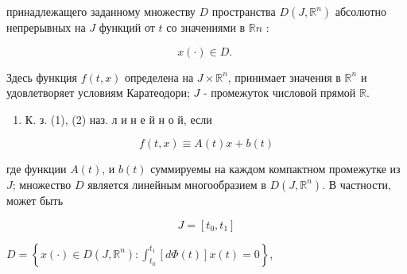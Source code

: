 \documentclass[10pt]{article}
\begin{document}
принадлежащего заданному множеству $D$ пространства $D\left(J, \mathbb{R}^{n}\right)$ абсолютно непрерывных на $J$ функций от $t$ со значениями в $\mathbb{R} n$ :



\[

x(\cdot) \in D \text {. }

\]



Здесь функция $f(t, x)$ определена на $J \times \mathbb{R}^{n}$, принимает значения в $\mathbb{R}^{n}$ и удовлетворяет условиям Каратеодори; $J$ - промежуток числовой прямой $\mathbb{R}$.



\begin{enumerate}

  \item К. з. (1), (2) наз. л и н е й н о й, если

\end{enumerate}



\[

f(t, x) \equiv A(t) x+b(t)

\]



где функции $A(t)$, и $b(t)$ суммируемы на каждом компактном промежутке из $J$; множество $D$ является линейным многообразием в $D\left(J, \mathbb{R}^{n}\right)$. В частности, может быть



\[

J=\left[t_{0}, t_{1}\right]

\]



$D=\left\{x(\cdot) \in D\left(J, \mathbb{R}^{n}\right): \int_{t_{0}}^{t_{1}}[d \Phi(t)] x(t)=0\right\}$,
\end{document}
